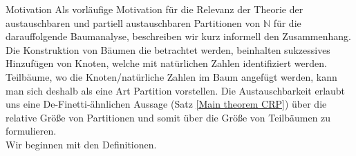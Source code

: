 \begin{section}{Motivation}
Als vorläufige Motivation für die Relevanz der Theorie der austauschbaren und partiell austauschbaren Partitionen von $\mathbb{N}$ für die darauffolgende Baumanalyse, beschreiben wir kurz informell den Zusammenhang. Die Konstruktion von Bäumen die betrachtet werden, beinhalten sukzessives Hinzufügen von Knoten, welche mit natürlichen Zahlen identifiziert werden. Teilbäume, wo die Knoten/natürliche Zahlen im Baum angefügt werden, kann man sich deshalb als eine Art Partition vorstellen. Die Austauschbarkeit erlaubt uns eine De-Finetti-ähnlichen Aussage (Satz \ref{Main theorem CRP}) über die relative Größe von Partitionen und somit über die Größe von Teilbäumen zu formulieren. \\
Wir beginnen mit den Definitionen. 
\end{section}
